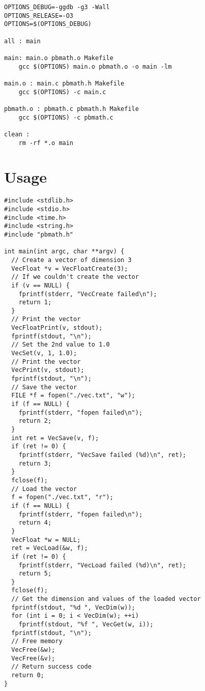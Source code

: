 \documentclass[12pt, a4paper]{article}
\begin{document}
\begin{scriptsize}
\begin{ttfamily}
\begin{lstlisting}
OPTIONS_DEBUG=-ggdb -g3 -Wall
OPTIONS_RELEASE=-O3 
OPTIONS=$(OPTIONS_DEBUG)

all : main

main: main.o pbmath.o Makefile 
	gcc $(OPTIONS) main.o pbmath.o -o main -lm

main.o : main.c pbmath.h Makefile
	gcc $(OPTIONS) -c main.c

pbmath.o : pbmath.c pbmath.h Makefile
	gcc $(OPTIONS) -c pbmath.c

clean : 
	rm -rf *.o main
\end{lstlisting}
\end{ttfamily}
\end{scriptsize}

\section{Usage}

\begin{scriptsize}
\begin{ttfamily}
\begin{lstlisting}
#include <stdlib.h>
#include <stdio.h>
#include <time.h>
#include <string.h>
#include "pbmath.h"

int main(int argc, char **argv) {
  // Create a vector of dimension 3
  VecFloat *v = VecFloatCreate(3);
  // If we couldn't create the vector
  if (v == NULL) {
    fprintf(stderr, "VecCreate failed\n");
    return 1;
  }
  // Print the vector
  VecFloatPrint(v, stdout);
  fprintf(stdout, "\n");
  // Set the 2nd value to 1.0
  VecSet(v, 1, 1.0);
  // Print the vector
  VecPrint(v, stdout);
  fprintf(stdout, "\n");
  // Save the vector
  FILE *f = fopen("./vec.txt", "w");
  if (f == NULL) {
    fprintf(stderr, "fopen failed\n");
    return 2;
  }
  int ret = VecSave(v, f);
  if (ret != 0) {
    fprintf(stderr, "VecSave failed (%d)\n", ret);
    return 3;
  }
  fclose(f);
  // Load the vector
  f = fopen("./vec.txt", "r");
  if (f == NULL) {
    fprintf(stderr, "fopen failed\n");
    return 4;
  }
  VecFloat *w = NULL;
  ret = VecLoad(&w, f);
  if (ret != 0) {
    fprintf(stderr, "VecLoad failed (%d)\n", ret);
    return 5;
  }
  fclose(f);
  // Get the dimension and values of the loaded vector
  fprintf(stdout, "%d ", VecDim(w));
  for (int i = 0; i < VecDim(w); ++i)
    fprintf(stdout, "%f ", VecGet(w, i));
  fprintf(stdout, "\n");
  // Free memory
  VecFree(&w);
  VecFree(&v);
  // Return success code
  return 0;
}
\end{lstlisting}
\end{ttfamily}
\end{scriptsize}
\end{document}
